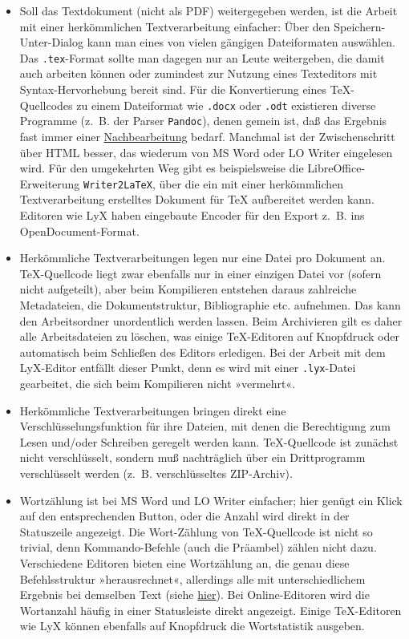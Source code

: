 \documentclass[11pt,a4paper,ngerman,DIV=8]{scrartcl}
\begin{document}
\begin{itemize}
  \item Soll das Textdokument (nicht als PDF) weitergegeben werden, ist die Arbeit mit einer herkömmlichen Textverarbeitung einfacher: Über den Speichern-Unter-Dialog kann man eines von vielen gängigen Dateiformaten auswählen. Das \texttt{.tex}-Format sollte man dagegen nur an Leute weitergeben, die damit auch arbeiten können oder zumindest zur Nutzung eines Texteditors mit Syntax-Hervorhebung bereit sind. Für die Konvertierung eines \TeX{}-Quellcodes zu einem Dateiformat wie \texttt{.docx} oder \texttt{.odt} existieren diverse Programme (z.~B. der Parser \texttt{Pandoc}), denen gemein ist, daß das Ergebnis fast immer einer \href{https://www.teuderun.de/latex/transformation/}{Nachbearbeitung} bedarf. Manchmal ist der Zwischenschritt über HTML besser, das wiederum von MS Word oder LO Writer eingelesen wird. Für den umgekehrten Weg gibt es beispielsweise die LibreOffice-Erweiterung \texttt{Writer2LaTeX}, über die ein mit einer herkömmlichen Textverarbeitung erstelltes Dokument für \TeX{} aufbereitet werden kann. Editoren wie LyX haben eingebaute Encoder für den Export z.~B. ins OpenDocument-Format.
  \item Herkömmliche Textverarbeitungen legen nur eine Datei pro Dokument an. \TeX{}-Quellcode liegt zwar ebenfalls nur in einer einzigen Datei vor (sofern nicht aufgeteilt), aber beim Kompilieren entstehen daraus zahlreiche Metadateien, die Dokumentstruktur, Bibliographie etc. aufnehmen. Das kann den Arbeitsordner unordentlich werden lassen. Beim Archivieren gilt es daher alle Arbeitsdateien zu löschen, was einige \TeX{}-Editoren auf Knopfdruck oder automatisch beim Schließen des Editors erledigen. Bei der Arbeit mit dem LyX-Editor entfällt dieser Punkt, denn es wird mit einer \texttt{.lyx}-Datei gearbeitet, die sich beim Kompilieren nicht »vermehrt«.
  \item Herkömmliche Textverarbeitungen bringen direkt eine Verschlüsselungsfunktion für ihre Dateien, mit denen die Berechtigung zum Lesen und/oder Schreiben geregelt werden kann. \TeX{}-Quellcode ist zunächst nicht verschlüsselt, sondern muß nachträglich über ein Drittprogramm verschlüsselt werden (z.~B. verschlüsseltes ZIP-Archiv).
  \item Wortzählung ist bei MS Word und LO Writer einfacher; hier genügt ein Klick auf den entsprechenden Button, oder die Anzahl wird direkt in der Statuszeile angezeigt. Die Wort-Zählung von \TeX{}-Quellcode ist nicht so trivial, denn Kommando-Befehle (auch die Präambel) zählen nicht dazu. Verschiedene Editoren bieten eine Wortzählung an, die genau diese Befehlsstruktur »herausrechnet«, allerdings alle mit unterschiedlichem Ergebnis bei demselben Text (siehe \href{https://www.teuderun.de/latex/n\%C3\%BCtzliche-kniffe/w\%C3\%B6rter-z\%C3\%A4hlen/}{hier}). Bei Online-Editoren wird die Wortanzahl häufig in einer Statusleiste direkt angezeigt. Einige \TeX{}-Editoren wie LyX können ebenfalls auf Knopfdruck die Wortstatistik ausgeben.

\end{itemize}
\end{document}
